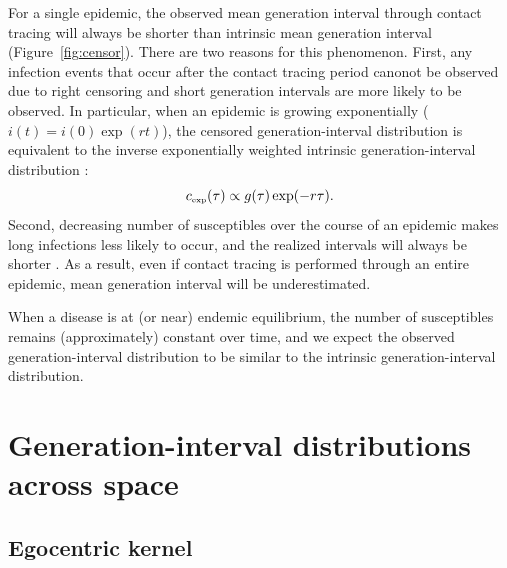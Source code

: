 \documentclass[12pt]{article}
\newcommand{\tsub}[2]{#1_{{\textrm{\tiny #2}}}}
\begin{document}
For a single epidemic, the observed mean generation interval through contact tracing will always be shorter than intrinsic mean generation interval (Figure~\ref{fig:censor}).
There are two reasons for this phenomenon.
First, any infection events that occur after the contact tracing period canonot be observed due to right censoring and short generation intervals are more likely to be observed.
In particular, when an epidemic is growing exponentially ($i(t) = i(0) \exp(rt)$), 
the censored generation-interval distribution is equivalent to the inverse exponentially weighted intrinsic generation-interval distribution \citep{britton2019estimation}:
\begin{equation}
\tsub{c}{exp}(\tau) \propto g(\tau) \exp(-r\tau).
\label{eq:exp}
\end{equation}
Second, decreasing number of susceptibles over the course of an epidemic makes long infections less likely to occur, and the realized intervals will always be shorter \citep{champredon2015intrinsic}.
As a result, even if contact tracing is performed through an entire epidemic, mean generation interval will be underestimated.

When a disease is at (or near) endemic equilibrium, the number of susceptibles remains (approximately) constant over time, and we expect the observed generation-interval distribution to be similar to the intrinsic generation-interval distribution.

\section{Generation-interval distributions across space}

\subsection{Egocentric kernel}
\end{document}
